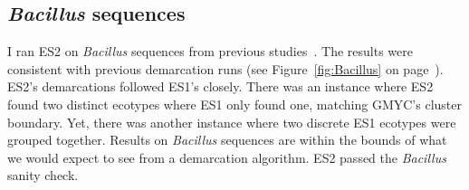%
%

\subsection*{\emph{Bacillus} sequences}
I ran ES2 on \emph{Bacillus} sequences from previous studies~\cite{connor2010ecology}.
The results were consistent with previous demarcation runs (see Figure~\ref{fig:Bacillus} on page~\pageref{fig:Bacillus}).
ES2's demarcations followed ES1's closely.
There was an instance where ES2 found two distinct ecotypes where ES1 only found one, matching GMYC's cluster boundary.
Yet, there was another instance where two discrete ES1 ecotypes were grouped together.
Results on \emph{Bacillus} sequences are within the bounds of what we would expect to see from a demarcation algorithm.
ES2 passed the \emph{Bacillus} sanity check.

